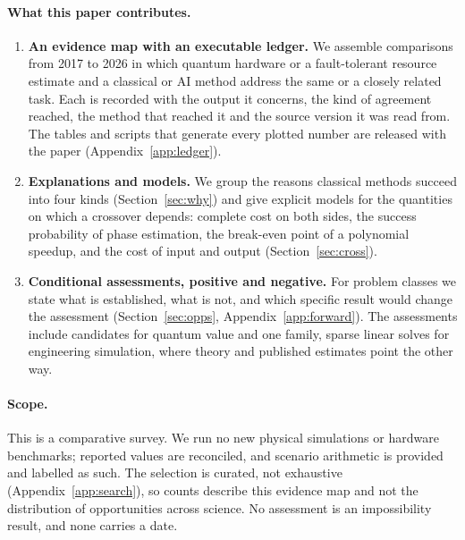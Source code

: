 \paragraph{What this paper contributes.}
\begin{enumerate}[leftmargin=*]
\item \textbf{An evidence map with an executable ledger.} We assemble \nEntries{} comparisons from 2017 to 2026 in which quantum hardware or a fault-tolerant resource estimate and a classical or AI method address the same or a closely related task. Each is recorded with the output it concerns, the kind of agreement reached, the method that reached it and the source version it was read from. The tables and scripts that generate every plotted number are released with the paper (Appendix~\ref{app:ledger}).
\item \textbf{Explanations and models.} We group the reasons classical methods succeed into four kinds (Section~\ref{sec:why}) and give explicit models for the quantities on which a crossover depends: complete cost on both sides, the success probability of phase estimation, the break-even point of a polynomial speedup, and the cost of input and output (Section~\ref{sec:cross}).
\item \textbf{Conditional assessments, positive and negative.} For \nClasses{} problem classes we state what is established, what is not, and which specific result would change the assessment (Section~\ref{sec:opps}, Appendix~\ref{app:forward}). The assessments include candidates for quantum value and one family, sparse linear solves for engineering simulation, where theory and published estimates point the other way.
\end{enumerate}

\paragraph{Scope.} This is a comparative survey. We run no new physical simulations or hardware benchmarks; reported values are reconciled, and scenario arithmetic is provided and labelled as such. The selection is curated, not exhaustive (Appendix~\ref{app:search}), so counts describe this evidence map and not the distribution of opportunities across science. No assessment is an impossibility result, and none carries a date.

